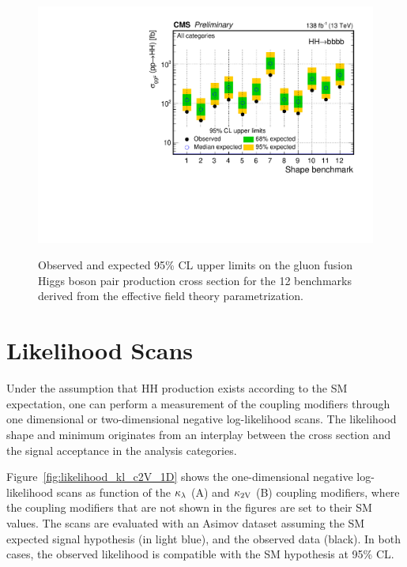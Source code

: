 \begin{figure}[!htb]
\centering
{\includegraphics[width=0.50\linewidth]{Figures/Results/additional/CMS-PAS-HIG-20-005_Figure-aux_006.pdf}}
\caption[Observed and expected 95\% CL upper limits on the gluon fusion Higgs boson pair production cross section for the 12 benchmarks]{\label{fig:benchmarks}Observed and expected 95\% CL upper limits on the gluon fusion Higgs boson pair production cross section for the 12 benchmarks derived from the effective field theory parametrization.
}
\end{figure}

\clearpage
\section{Likelihood Scans} \label{results:likelihoods}
Under the assumption that HH production exists according to the SM expectation, one can perform a measurement of the coupling modifiers through one dimensional or two-dimensional negative log-likelihood scans. The likelihood shape and minimum originates from an interplay between the cross section and the signal acceptance in the analysis categories. 

Figure~\ref{fig:likelihood_kl_c2V_1D} shows the one-dimensional negative log-likelihood scans as function of the $\kappa_{\lambda}$ (A) and $\mathrm{\kappa_{2V} }$ (B) coupling modifiers, where the coupling modifiers that are not shown in the figures are set to their SM values. The scans are evaluated with an Asimov dataset assuming the SM expected signal hypothesis (in light blue), and the observed data (black). In both cases, the observed likelihood is compatible with the SM hypothesis at 95\% CL.

